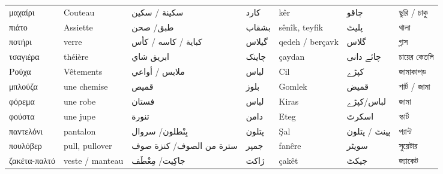 \begin{longtable}{p{3.5cm} p{3.5cm} p{3.5cm} p{3.5cm} p{3.5cm} p{3.5cm} p{3.5cm} }
 μαχαίρι                                    & Couteau                                                          & سكينة  / سكين                    & کارد                & kêr                        & چاقو                                                  & ছুরি / চাকু                                 \\
 πιάτο                                      & Assiette                                                         & طبق/ صحن                         & بشقاب               & sênîk, teyfik              & پلیٹ                                                  & থালা                                        \\
 ποτήρι                                     & verre                                                            & كباية     / كاسه / كأس           & گیلاس               & qedeh / berçavk            & گلاس                                                  & গ্লাস                                       \\
 τσαγιέρα                                   & théière                                                          & ابريق شاي                        & چاینک               & çaydan                     & چائے دانی                                             & চায়ের কেতলি                                 \\
\midrule
 Ρούχα           & Vêtements       & ملابس / أواعي           &  لباس     & Cil              & کپڑے                                & জামাকাপড়     \\
\midrule
 μπλούζα         & une chemise     & قميص                    & بلوز      & Gomlek           & قمیض                                & শার্ট / জামা \\
 φόρεμα          & une robe        & فستان                   & لباس      & Kiras            & لباس/کپڑے                           & জামা         \\
 φούστα          & une jupe        & تنورة                   & دامن      & Eteg             & اسکرٹ                               & স্কার্ট      \\
 παντελόνι       & pantalon        & بِنْطلون/ سروال         & پتلون     & Şal              & پینٹ / پتلون                        & প্যান্ট      \\
 πουλόβερ        & pull, pullover  & سترة من الصوف/ كنزة صوف & جمپر      & fanêre           & سویٹر                               & সুয়েটার      \\
 ζακέτα-παλτό    & veste / manteau & جاكِيت/ مِعْطَف         & ژاکت      & çakêt            & جیکٹ                                & জ্যাকেট      \\

\end{longtable}
